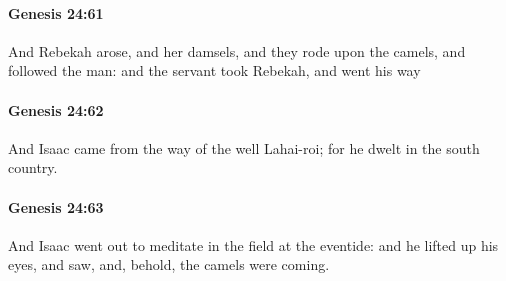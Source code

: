 		\paragraph{Genesis 24:61} %
			\label{GENESIS-24-61}

			And Rebekah arose, and her damsels, and they rode upon the camels, and followed the man: and the servant took Rebekah, and went his way


		\paragraph{Genesis 24:62} %
			\label{GENESIS-24-62}

			And Isaac came from the way of the well Lahai-roi; for he dwelt in the south country.


		\paragraph{Genesis 24:63} %
			\label{GENESIS-24-63}

			And Isaac went out to meditate in the field at the eventide: and he lifted up his eyes, and saw, and, behold, the camels were coming.


